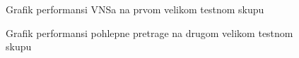 \documentclass[12pt,oneside]{memoir}
\begin{document}
\begin{figure}[H]
    \centering
    \hfill
    \caption{Grafik performansi VNSa na prvom velikom testnom skupu}
    \label{fig:test1_vns_performance}
\end{figure}

\vspace{2cm}

\begin{figure}[H]
    \centering
    \hfill
    \caption{Grafik performansi pohlepne pretrage na drugom velikom testnom skupu}
    \label{fig:test2_greedy_performance}
\end{figure}
\end{document}
